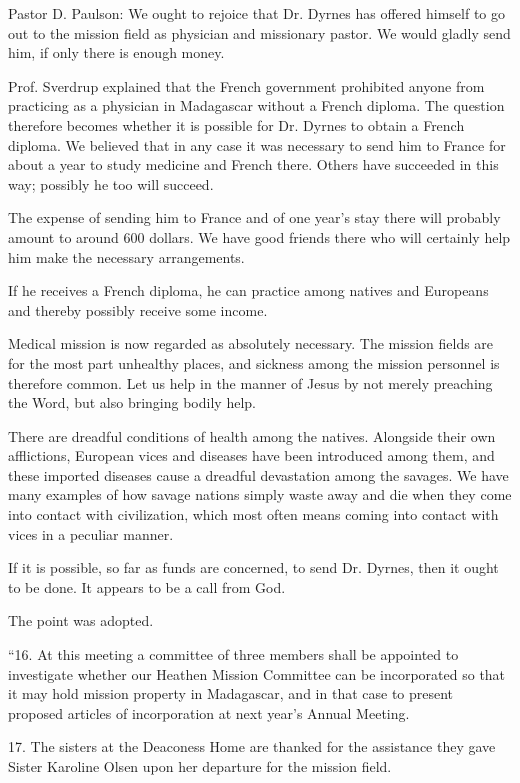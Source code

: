 Pastor D. Paulson: We ought to rejoice that Dr. Dyrnes has offered himself to go out to the mission field as physician and missionary pastor. We would gladly send him, if only there is enough money.

Prof. Sverdrup explained that the French government prohibited anyone from practicing as a physician in Madagascar without a French diploma. The question therefore becomes whether it is possible for Dr. Dyrnes to obtain a French diploma. We believed that in any case it was necessary to send him to France for about a year to study medicine and French there. Others have succeeded in this way; possibly he too will succeed.

The expense of sending him to France and of one year’s stay there will probably amount to around 600 dollars. We have good friends there who will certainly help him make the necessary arrangements.

If he receives a French diploma, he can practice among natives and Europeans and thereby possibly receive some income.

Medical mission is now regarded as absolutely necessary. The mission fields are for the most part unhealthy places, and sickness among the mission personnel is therefore common. Let us help in the manner of Jesus by not merely preaching the Word, but also bringing bodily help.

There are dreadful conditions of health among the natives. Alongside their own afflictions, European vices and diseases have been introduced among them, and these imported diseases cause a dreadful devastation among the savages. We have many examples of how savage nations simply waste away and die when they come into contact with civilization, which most often means coming into contact with vices in a peculiar manner.

If it is possible, so far as funds are concerned, to send Dr. Dyrnes, then it ought to be done. It appears to be a call from God.

The point was adopted.

“16. At this meeting a committee of three members shall be appointed to investigate whether our Heathen Mission Committee can be incorporated so that it may hold mission property in Madagascar, and in that case to present proposed articles of incorporation at next year’s Annual Meeting.

17. The sisters at the Deaconess Home are thanked for the assistance they gave Sister Karoline Olsen upon her departure for the mission field.

